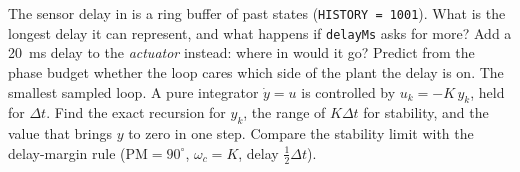 \begin{exercises}
\exercise[2] The sensor delay in  is a ring buffer of past states (\texttt{HISTORY = 1001}). What is the longest delay it can represent, and what happens if \texttt{delayMs} asks for more? Add a \SI{20}{ms} delay to the \emph{actuator} instead: where in  would it go? Predict from the phase budget whether the loop cares which side of the plant the delay is on.
\exercise[3] The smallest sampled loop. A pure integrator $\dot y = u$ is controlled by $u_k = -K\,y_k$, held for $\Delta t$. Find the exact recursion for $y_k$, the range of $K\Delta t$ for stability, and the value that brings $y$ to zero in one step. Compare the stability limit with the delay-margin rule ($\mathrm{PM} = 90^\circ$, $\omega_c = K$, delay $\tfrac12\Delta t$).
\end{exercises}
